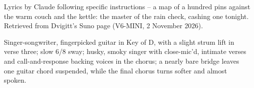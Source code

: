 
\label{sec:rain-check}
\begin{notes}
Lyrics by Claude following specific instructions -- a map of a hundred pins against the warm couch and the kettle: the master of the rain check, cashing one tonight. Retrieved from Dvigitt's Suno page (V6-MINI, 2 November 2026).
\end{notes}
\begin{style}
Singer-songwriter, fingerpicked guitar in Key of D, with a slight strum lift in verse three; slow 6/8 sway; husky, smoky singer with close-mic’d, intimate verses and call-and-response backing voices in the chorus; a nearly bare bridge leaves one guitar chord suspended, while the final chorus turns softer and almost spoken.
\end{style}
